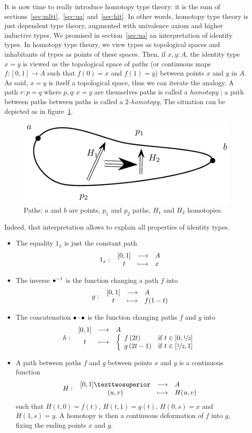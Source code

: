 It is now time to really introduce homotopy type theory: it is the sum
of sections~\ref{sec:mltt},~\ref{sec:ua} and~\ref{sec:hit}. In other
words, homotopy type theory is just dependent type theory, augmented
with univalence axiom and higher inductive types. We promised in
section~\ref{sec:ua} an interpretation of identity types. In homotopy
type theory, we view types as topological spaces and inhabitants of types
as points of these spaces. Then, if $x,y:A$, the identity type $x=y$
is viewed as the topological space of paths (or continuous maps
$f:[0,1]\to A$ such that $f(0)=x$ and $f(1)=y$) between points $x$ and
$y$ in $A$. As said, $x=y$ is itself a topological space, thus we can
iterate the analogy. A path $r:p=q$ where $p,q:x=y$ are themselves
paths is called a {\em homotopy} ; a path between paths between paths
is called a {\em $2$-homotopy}, \etc{}
The situation can be depicted as in figure~\ref{fig:paths}.
\begin{figure}[h]
  \centering
  \includegraphics{path2}  
  \caption{Paths: $a$ and $b$ are points, $p_1$ and $p_2$ paths, $H_1$
  and $H_2$ homotopies.}
  \label{fig:paths}
\end{figure}
Indeed, that interpretation allows to explain all properties of
identity types.
\begin{itemize}
\item The equality $1_x$ is just the constant path 
  \[ 1_x \, \colon \left. \begin{array}{ccl} [0,1] & \longrightarrow & A \\ t & \longmapsto & x \end{array} \right. \]
\item The inverse $\bullet^{-1}$ is the function changing a path $f$ into
  \[ g \, \colon \left. \begin{array}{ccl} [0,1] & \longrightarrow & A \\ t & \longmapsto & f(1-t) \end{array} \right. \]
\item The concatenation $\bullet\cdot \bullet$ is the function
  changing paths $f$ and $g$ into
\[ \fonction{h}{[0,1]}{A}{t}%
  { \left\{
    \begin{array}{ll}
      f\left(2t\right) &\text{if } t\in[0,\nicefrac12] \\
      g\left(2t-1\right) &\text{if } t\in [\nicefrac12,1] 
    \end{array}
  \right.}
\]
\item A path between paths $f$ and $g$ between points $x$ and $y$ is a
  continuous function
  \[ 
    \fonction{H}{[0,1]²}{A}{(u,v)}{H(u,v)}
  \]
  such that $H(t,0) = f(t)$, $H(t,1) = g(t)$, $H(0,s)=x$ and
  $H(1,s)=y$. 
  A homotopy is then a continuous deformation of $f$ into $g$, fixing
  the ending points $x$ and $y$.
\end{itemize}

